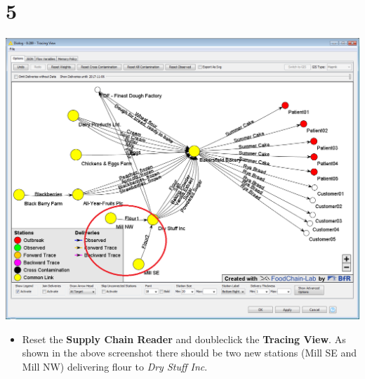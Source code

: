 \documentclass[10pt]{beamer}
\begin{document}
\section{5}
\begin{frame}
	\begin{center}
			\includegraphics[height=0.6\textheight]{5.png}
	\end{center}
	\begin{itemize}
		\item Reset the \textbf{Supply Chain Reader} and doubleclick the \textbf{Tracing View}. As shown in the above screenshot there should be two new stations (Mill SE and Mill NW) delivering flour to \textit{Dry Stuff Inc}.
	\end{itemize}
\end{frame}
\end{document}
